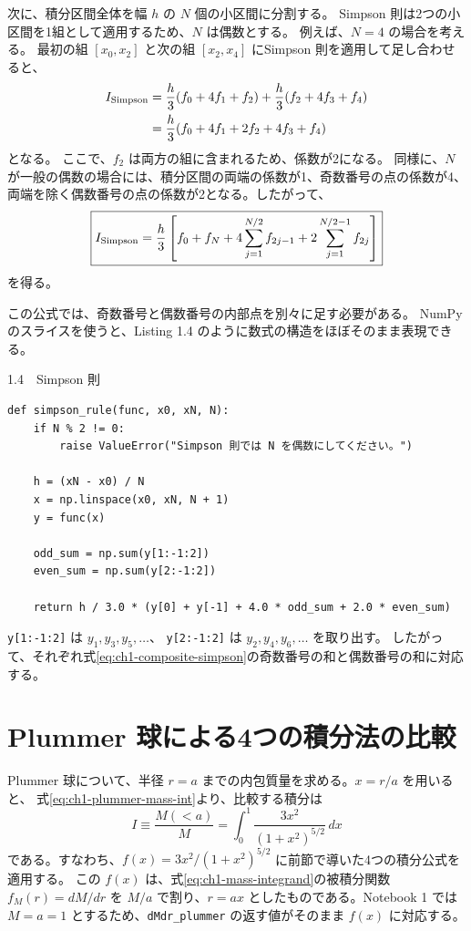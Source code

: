 次に、積分区間全体を幅 $h$ の $N$ 個の小区間に分割する。
Simpson 則は2つの小区間を1組として適用するため、$N$ は偶数とする。
例えば、$N=4$ の場合を考える。
最初の組 $[x_0,x_2]$ と次の組 $[x_2,x_4]$ にSimpson 則を適用して足し合わせると、
\begin{align}
 I_{\rm Simpson}
 &=
 \frac{h}{3}(f_0+4f_1+f_2)
 +\frac{h}{3}(f_2+4f_3+f_4)\\
 &=
 \frac{h}{3}(f_0+4f_1+2f_2+4f_3+f_4)
\end{align}
となる。
ここで、$f_2$ は両方の組に含まれるため、係数が2になる。
同様に、$N$ が一般の偶数の場合には、積分区間の両端の係数が1、奇数番号の点の係数が4、
両端を除く偶数番号の点の係数が2となる。したがって、
\begin{equation}
 \boxed{
 I_{\rm Simpson}
 =\frac{h}{3}\left[
 f_0+f_N
 +4\sum_{j=1}^{N/2}f_{2j-1}
 +2\sum_{j=1}^{N/2-1}f_{2j}
 \right]
 }
\label{eq:ch1-composite-simpson}
\end{equation}
を得る。

この公式では、奇数番号と偶数番号の内部点を別々に足す必要がある。
NumPy のスライスを使うと、Listing 1.4 のように数式の構造をほぼそのまま表現できる。
\begin{listingbox}{1.4　Simpson 則}
\begin{Verbatim}[fontsize=\small]
def simpson_rule(func, x0, xN, N):
    if N % 2 != 0:
        raise ValueError("Simpson 則では N を偶数にしてください。")

    h = (xN - x0) / N
    x = np.linspace(x0, xN, N + 1)
    y = func(x)

    odd_sum = np.sum(y[1:-1:2])
    even_sum = np.sum(y[2:-1:2])

    return h / 3.0 * (y[0] + y[-1] + 4.0 * odd_sum + 2.0 * even_sum)
\end{Verbatim}
\end{listingbox}

\texttt{y[1:-1:2]} は $y_1,y_3,y_5,\ldots$、
\texttt{y[2:-1:2]} は $y_2,y_4,y_6,\ldots$ を取り出す。
したがって、それぞれ式\eqref{eq:ch1-composite-simpson}の奇数番号の和と偶数番号の和に対応する。


\section{Plummer 球による4つの積分法の比較}
\label{sec:ch1-compare-rules}

Plummer 球について、半径 $r=a$ までの内包質量を求める。$x=r/a$ を用いると、
式\eqref{eq:ch1-plummer-mass-int}より、比較する積分は
\begin{equation}
 I\equiv\frac{M(<a)}{M}=\int_0^1\frac{3x^2}{(1+x^2)^{5/2}}\,dx
\label{eq:ch1-plummer-test-integral}
\end{equation}
である。すなわち、$f(x)=3x^2/(1+x^2)^{5/2}$ に前節で導いた4つの積分公式を適用する。
この $f(x)$ は、式\eqref{eq:ch1-mass-integrand}の被積分関数 $f_M(r)=dM/dr$ を $M/a$ で割り、$r=ax$ としたものである。Notebook 1 では $M=a=1$ とするため、\texttt{dMdr\_plummer} の返す値がそのまま $f(x)$ に対応する。


